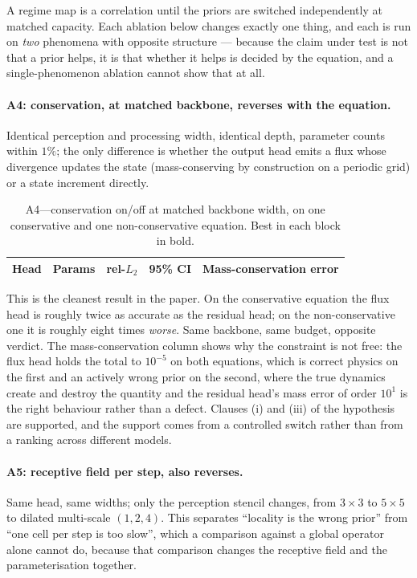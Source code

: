 \documentclass{article}
\begin{document}
A regime map is a correlation until the priors are switched independently at matched
capacity. Each ablation below changes exactly one thing, and each is run on \emph{two}
phenomena with opposite structure --- because the claim under test is not that a prior
helps, it is that whether it helps is decided by the equation, and a single-phenomenon
ablation cannot show that at all.

\paragraph{A4: conservation, at matched backbone, reverses with the equation.} Identical
perception and processing width, identical depth, parameter counts within $1\%$; the only
difference is whether the output head emits a flux whose divergence updates the state
(mass-conserving by construction on a periodic grid) or a state increment directly.

\begin{table}[h]
\centering
\caption{A4---conservation on/off at matched backbone width, on one conservative and one
non-conservative equation. Best in each block in bold.}
\label{tab:a4}
\small
\begin{tabular}{lrccc}
\toprule
Head & Params & rel-$L_2$ & 95\% CI & Mass-conservation error \\
\midrule

\bottomrule
\end{tabular}
\end{table}

This is the cleanest result in the paper. On the conservative equation the flux head is
roughly twice as accurate as the residual head; on the non-conservative one it is roughly
eight times \emph{worse}. Same backbone, same budget, opposite verdict. The mass-conservation
column shows why the constraint is not free: the flux head holds the total to $10^{-5}$ on
both equations, which is correct physics on the first and an actively wrong prior on the
second, where the true dynamics create and destroy the quantity and the residual head's mass
error of order $10^{1}$ is the right behaviour rather than a defect. Clauses (i) and (iii)
of the hypothesis are supported, and the support comes from a controlled switch rather than
from a ranking across different models.

\paragraph{A5: receptive field per step, also reverses.} Same head, same widths; only the
perception stencil changes, from $3\times3$ to $5\times5$ to dilated multi-scale $(1,2,4)$.
This separates ``locality is the wrong prior'' from ``one cell per step is too slow'', which
a comparison against a global operator alone cannot do, because that comparison changes the
receptive field and the parameterisation together.
\end{document}
